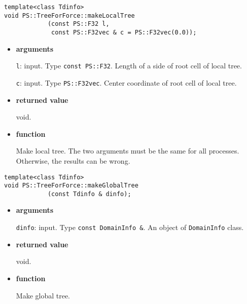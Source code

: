 \begin{screen}
\begin{verbatim}
template<class Tdinfo>
void PS::TreeForForce::makeLocalTree
            (const PS::F32 l,
             const PS::F32vec & c = PS::F32vec(0.0));
\end{verbatim}
\end{screen}

\begin{itemize}

\item {\bf arguments}

{\tt l}: input. Type {\tt const PS::F32}. Length of a side of root
cell of local tree.

{\tt c}: input. Type {\tt PS::F32vec}. Center coordinate of root cell of local tree.

\item {\bf returned value}

void.

\item {\bf function}

Make local tree. The two arguments must be the same for all processes. Otherwise, the results can be wrong.

\end{itemize}


\begin{screen}
\begin{verbatim}
template<class Tdinfo>
void PS::TreeForForce::makeGlobalTree
            (const Tdinfo & dinfo);        
\end{verbatim}
\end{screen}

\begin{itemize}

\item {\bf arguments}

{\tt dinfo}: input. Type {\tt const DomainInfo \&}. An object of {\tt DomainInfo} class.

\item {\bf returned value}

void.

\item {\bf function}

Make global tree.

\end{itemize}


